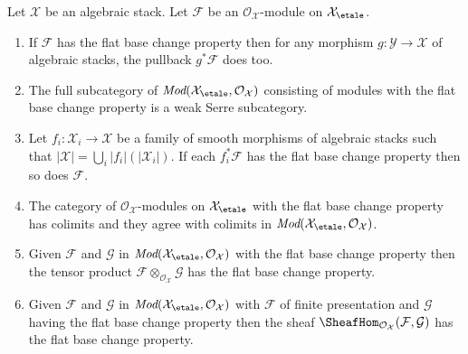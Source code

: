 %
\begin{lemma}
\label{lemma-check-flat-comparison-on-etale-covering}
Let $\mathcal{X}$ be an algebraic stack. Let $\mathcal{F}$
be an $\mathcal{O}_\mathcal{X}$-module on $\mathcal{X}_\etale$.
\begin{enumerate}
\item If $\mathcal{F}$ has the flat base change property then for any morphism
$g : \mathcal{Y} \to \mathcal{X}$ of algebraic stacks, the
pullback $g^*\mathcal{F}$ does too.
\item The full subcategory of
$\textit{Mod}(\mathcal{X}_\etale, \mathcal{O}_\mathcal{X})$
consisting of modules with the flat base change property
is a weak Serre subcategory.
\item  Let $f_i : \mathcal{X}_i \to \mathcal{X}$ be a family of
smooth morphisms of algebraic stacks such that
$|\mathcal{X}| = \bigcup_i |f_i|(|\mathcal{X}_i|)$. If each
$f_i^*\mathcal{F}$ has the flat base change property then so does
$\mathcal{F}$.
\item The category of $\mathcal{O}_\mathcal{X}$-modules
on $\mathcal{X}_\etale$ with the flat base change property
has colimits and they agree with colimits in
$\textit{Mod}(\mathcal{X}_\etale, \mathcal{O}_\mathcal{X})$.
\item Given $\mathcal{F}$ and $\mathcal{G}$ in
$\textit{Mod}(\mathcal{X}_\etale, \mathcal{O}_\mathcal{X})$
with the flat base change property then the tensor product
$\mathcal{F} \otimes_{\mathcal{O}_\mathcal{X}} \mathcal{G}$
has the flat base change property.
\item Given $\mathcal{F}$ and $\mathcal{G}$ in
$\textit{Mod}(\mathcal{X}_\etale, \mathcal{O}_\mathcal{X})$
with $\mathcal{F}$ of finite presentation and $\mathcal{G}$ having
the flat base change property then the sheaf
$\SheafHom_{\mathcal{O}_\mathcal{X}}(\mathcal{F}, \mathcal{G})$
has the flat base change property.
\end{enumerate}
\end{lemma}

